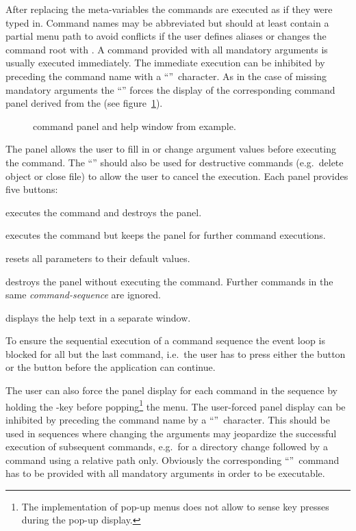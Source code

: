 After replacing the meta-variables the commands are executed as if
they were typed in. 
Command names may be abbreviated but should at least contain a partial
menu path to avoid conflicts if the user defines aliases or changes
the command root with . 
A command provided with all mandatory arguments is usually executed
immediately. 
The immediate execution can be inhibited by preceding the command name
with a ``\Lit{-}''~character.
As in the case of missing mandatory arguments the ``\Lit{-}'' forces the
display of the corresponding command panel derived from the \CDF{} (see
figure~\ref{fig-motif-panel}). 

\begin{figure}[htb]
\begin{sideways}
\end{sideways}
\hspace{\fill}
\begin{sideways}
\end{sideways}
\caption{\Motif{} command panel and help window from \CDF{} example.
\label{fig-motif-panel}}
\end{figure}

The panel allows the user to fill in or change argument values before
executing the command.
The ``\Lit{-}'' should also be used for destructive commands 
(e.g.\ delete object or close file) to allow the user to cancel the execution.
Each panel provides five buttons:
\begin{UL}
\item {} executes the command and destroys the panel.
\item {} executes the command but keeps the panel for
further command executions.
\item {} resets all parameters to their default values.
\item {} destroys the panel without executing the command.
Further commands in the same \textsl{command-sequence} are ignored.
\item {} displays the help text in a separate window.
\end{UL}
To ensure the sequential execution of a command sequence the \Motif{}
event loop is blocked for all but the last command, i.e.\ 
the user has to press either the  button or the 
button before the application can continue.

The user can also force the panel display for each command in the
sequence by holding the \Lit{CTRL}-key before popping\footnote{
The \Motif{} implementation of pop-up menus does not allow to sense key
presses during the pop-up display.}
the menu.
The user-forced panel display can be inhibited by preceding the
command name by a ``\Lit{+}''~character.
This should be used in sequences where changing the arguments may
jeopardize the successful execution of subsequent commands, e.g.\ for
a directory change followed by a command using a relative path only.
Obviously the corresponding ``\Lit{+}''~command has to be provided with all
mandatory arguments in order to be executable.

